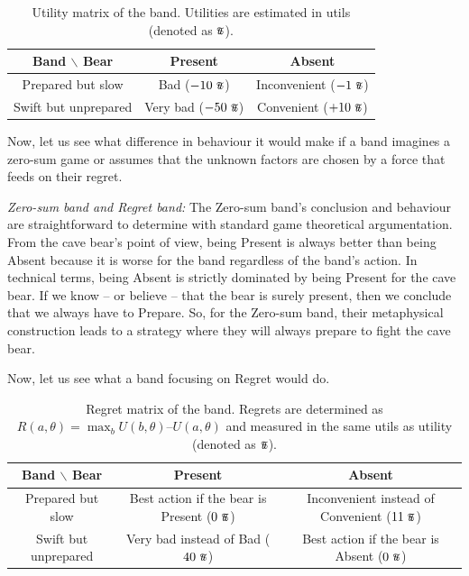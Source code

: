 \documentclass{article}
\newcommand{\util}{\scalebox{0.75}{\text{\Pfund}}}
\begin{document}
\begin{table}[h!]
    \centering
    \begin{tabular}{c|cc}
        Band $\backslash$ Bear & Present & Absent \\
        \hline
        Prepared but slow & Bad ($-10\ \util$) & Inconvenient ($-1\ \util$) \\
        Swift but unprepared & Very bad ($-50\ \util$) & Convenient ($+10\ \util$) \\
    \end{tabular}
    \caption{Utility matrix of the band. Utilities are estimated in utils (denoted as $\util$).}
    \label{tab:BandBearUtilityMatrix}
\end{table}

Now, let us see what difference in behaviour it would make if a band imagines a zero-sum game or assumes that the unknown factors are chosen by a force that feeds on their regret.

{\it Zero-sum band and Regret band:}
The Zero-sum band's conclusion and behaviour are straightforward to determine with standard game theoretical argumentation.
From the cave bear’s point of view, being Present is always better than being Absent because it is worse for the band regardless of the band's action. In technical terms, being Absent is strictly dominated by being Present for the cave bear.
If we know – or believe – that the bear is surely present, then we conclude that we always have to Prepare. So, for the Zero-sum band, their metaphysical construction leads to a strategy where they will always prepare to fight the cave bear.

Now, let us see what a band focusing on Regret would do.

\begin{table}[h!]
    \centering
    \begin{tabular}{c|cc}
        Band $\backslash$ Bear & Present & Absent \\
        \hline
        Prepared but slow & Best action if the bear is Present ($0\ \util$) & Inconvenient instead of Convenient ($11\ \util$) \\
        Swift but unprepared & Very bad instead of Bad ($40\ \util$) & Best action if the bear is Absent ($0\ \util$) \\
    \end{tabular}
    \caption{Regret matrix of the band. Regrets are determined as $R(a,\theta) = \max_{b} U(b,\theta) – U(a,\theta)$ and measured in the same utils as utility (denoted as $\util$).}
    \label{tab:BandBearRegretMatrix}
\end{table}
\end{document}
